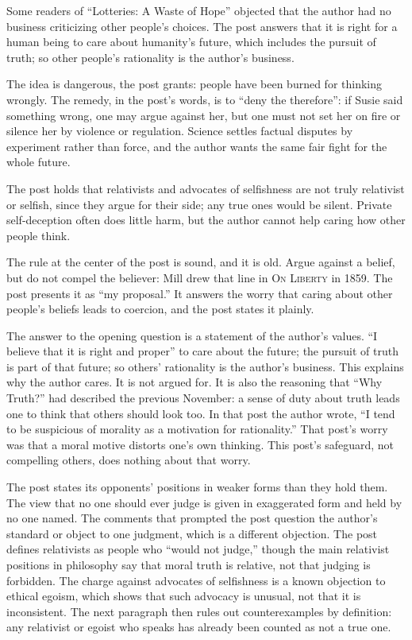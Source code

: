 \begin{afterword}
\summaryhead

Some readers of ``Lotteries: A Waste of Hope'' objected that the author had no business criticizing other people's choices. The post answers that it is right for a human being to care about humanity's future, which includes the pursuit of truth; so other people's rationality is the author's business.

The idea is dangerous, the post grants: people have been burned for thinking wrongly. The remedy, in the post's words, is to ``deny the therefore'': if Susie said something wrong, one may argue against her, but one must not set her on fire or silence her by violence or regulation. Science settles factual disputes by experiment rather than force, and the author wants the same fair fight for the whole future.

The post holds that relativists and advocates of selfishness are not truly relativist or selfish, since they argue for their side; any true ones would be silent. Private self-deception often does little harm, but the author cannot help caring how other people think.

\responsehead

The rule at the center of the post is sound, and it is old. Argue against a belief, but do not compel the believer: Mill drew that line in \textsc{On Liberty} in 1859. The post presents it as ``my proposal.'' It answers the worry that caring about other people's beliefs leads to coercion, and the post states it plainly.

The answer to the opening question is a statement of the author's values. ``I believe that it is right and proper'' to care about the future; the pursuit of truth is part of that future; so others' rationality is the author's business. This explains why the author cares. It is not argued for. It is also the reasoning that ``Why Truth?'' had described the previous November: a sense of duty about truth leads one to think that others should look too. In that post the author wrote, ``I tend to be suspicious of morality as a motivation for rationality.'' That post's worry was that a moral motive distorts one's own thinking. This post's safeguard, not compelling others, does nothing about that worry.

The post states its opponents' positions in weaker forms than they hold them. The view that no one should ever judge is given in exaggerated form and held by no one named. The comments that prompted the post question the author's standard or object to one judgment, which is a different objection. The post defines relativists as people who ``would not judge,'' though the main relativist positions in philosophy say that moral truth is relative, not that judging is forbidden. The charge against advocates of selfishness is a known objection to ethical egoism, which shows that such advocacy is unusual, not that it is inconsistent. The next paragraph then rules out counterexamples by definition: any relativist or egoist who speaks has already been counted as not a true one.


\end{afterword}
